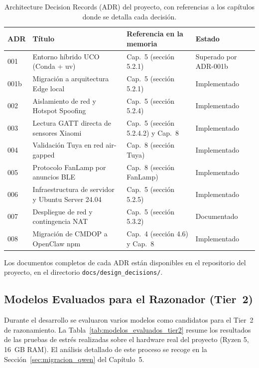 \begin{table}[ht]
\centering
\begin{tabular}{|p{0.6cm}|p{3.8cm}|p{3cm}|p{4.5cm}|}
\hline
\textbf{ADR} & \textbf{Título} & \textbf{Referencia en la memoria} & \textbf{Estado} \\
\hline
001 & Entorno híbrido UCO (Conda + uv) & Cap.~5 (sección 5.2.1) & Superado por ADR-001b \\
001b & Migración a arquitectura Edge local & Cap.~5 (sección 5.2.1) & Implementado \\
002 & Aislamiento de red y Hotspot Spoofing & Cap.~5 (sección 5.2.4) & Implementado \\
003 & Lectura GATT directa de sensores Xiaomi & Cap.~5 (sección 5.2.4.2) y Cap.~8 & Implementado \\
004 & Validación Tuya en red air-gapped & Cap.~8 (sección Tuya) & Implementado \\
005 & Protocolo FanLamp por anuncios BLE & Cap.~8 (sección FanLamp) & Implementado \\
006 & Infraestructura de servidor y Ubuntu Server 24.04 & Cap.~5 (sección 5.2.5) & Implementado \\
007 & Despliegue de red y contingencia NAT & Cap.~5 (sección 5.3.2) & Documentado \\
008 & Migración de CMDOP a OpenClaw npm & Cap.~4 (sección 4.6) y Cap.~8 & Implementado \\
\hline
\end{tabular}
\caption{Architecture Decision Records (ADR) del proyecto, con referencias a los capítulos donde se detalla cada decisión.}
\label{tab:adrs}
\end{table}

Los documentos completos de cada ADR están disponibles en el repositorio del proyecto, en el directorio \texttt{docs/design\_decisions/}.

\subsection{Modelos Evaluados para el Razonador (Tier~2)}
\label{sec:mejora_modelos}

Durante el desarrollo se evaluaron varios modelos como candidatos para el Tier~2 de razonamiento. La Tabla~\ref{tab:modelos_evaluados_tier2} resume los resultados de las pruebas de estrés realizadas sobre el hardware real del proyecto (Ryzen 5, 16~GB RAM). El análisis detallado de este proceso se recoge en la Sección~\ref{sec:migracion_qwen} del Capítulo~5.

